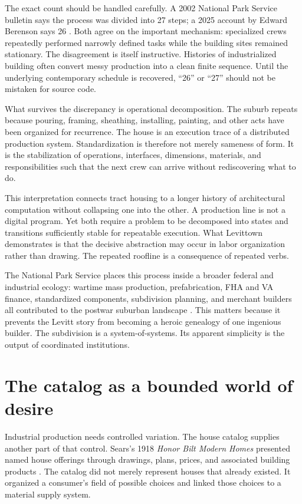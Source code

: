 \documentclass[11pt]{article}
\begin{document}
The exact count should be handled carefully. A 2002 National Park Service bulletin says the process was divided into 27 steps; a 2025 account by Edward Berenson says 26 \citep{amesmcclelland2002suburbs,berenson2025levitt}. Both agree on the important mechanism: specialized crews repeatedly performed narrowly defined tasks while the building sites remained stationary. The disagreement is itself instructive. Histories of industrialized building often convert messy production into a clean finite sequence. Until the underlying contemporary schedule is recovered, ``26'' or ``27'' should not be mistaken for source code.

What survives the discrepancy is operational decomposition. The suburb repeats because pouring, framing, sheathing, installing, painting, and other acts have been organized for recurrence. The house is an execution trace of a distributed production system. Standardization is therefore not merely sameness of form. It is the stabilization of operations, interfaces, dimensions, materials, and responsibilities such that the next crew can arrive without rediscovering what to do.

This interpretation connects tract housing to a longer history of architectural computation without collapsing one into the other. A production line is not a digital program. Yet both require a problem to be decomposed into states and transitions sufficiently stable for repeatable execution. What Levittown demonstrates is that the decisive abstraction may occur in labor organization rather than drawing. The repeated roofline is a consequence of repeated verbs.

The National Park Service places this process inside a broader federal and industrial ecology: wartime mass production, prefabrication, FHA and VA finance, standardized components, subdivision planning, and merchant builders all contributed to the postwar suburban landscape \citep{amesmcclelland2002suburbs}. This matters because it prevents the Levitt story from becoming a heroic genealogy of one ingenious builder. The subdivision is a system-of-systems. Its apparent simplicity is the output of coordinated institutions.

\section{The catalog as a bounded world of desire}
Industrial production needs controlled variation. The house catalog supplies another part of that control. Sears's 1918 \emph{Honor Bilt Modern Homes} presented named house offerings through drawings, plans, prices, and associated building products \citep{sears1918honorbilt}. The catalog did not merely represent houses that already existed. It organized a consumer's field of possible choices and linked those choices to a material supply system.
\end{document}
